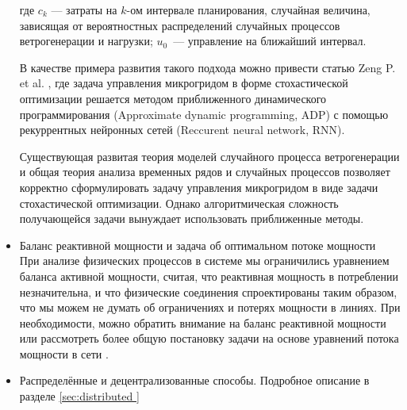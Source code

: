 \begin{itemize}
    где $c_k$ --- затраты на $k$-ом интервале планирования, случайная величина, зависящая от вероятностных распределений случайных процессов ветрогенерации и нагрузки; $u_0$~--- управление на ближайший интервал.
    
    
    В качестве примера развития такого подхода можно привести статью Zeng P. et al. \cite{zeng2018dynamic}, где задача управления микрогридом в форме стохастической оптимизации решается методом приближенного динамического программирования (Approximate dynamic programming, ADP) с помощью рекуррентных нейронных сетей (Reccurent neural network, RNN).
    
    Существующая развитая теория моделей случайного процесса ветрогенерации \cite{legessegenerating} и общая теория анализа временных рядов и случайных процессов позволяет корректно сформулировать задачу управления микрогридом в виде задачи стохастической оптимизации.
    Однако алгоритмическая сложность получающейся задачи вынуждает использовать приближенные методы.
    
    
    
    \item Баланс реактивной мощности и задача об оптимальном потоке мощности\\
    При анализе физических процессов в системе мы ограничились уравнением баланса активной мощности, считая, что реактивная мощность в потреблении незначительна, и что физические соединения спроектированы таким образом, что мы можем не думать об ограничениях и потерях мощности в линиях.
    При необходимости, можно обратить внимание на баланс реактивной мощности \cite{zhang2016reactive} или рассмотреть более общую постановку задачи на основе уравнений потока мощности в сети \cite{kim2000comparison, molzahn2017survey}.
    
    \item Распределённые и децентрализованные способы.
    Подробное описание в разделе \ref{sec:distributed   }
    
\end{itemize}
